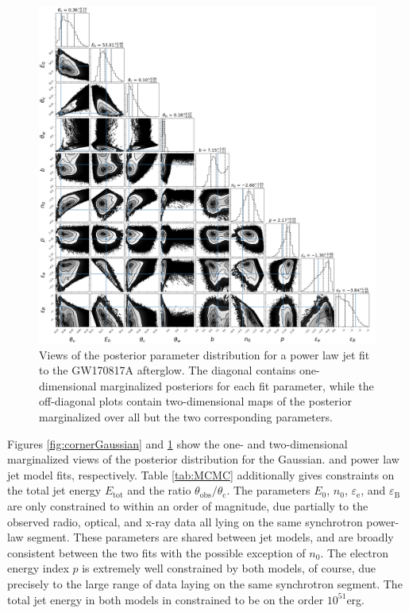 \documentclass[twocolumn]{aastex62}
\newcommand{\gwbns}{GW170817A}
\newcommand{\thobs}{\ensuremath{\theta_{\mathrm{obs}}}}
\newcommand{\thC}{\ensuremath{\theta_{\mathrm{c}}}}
\newcommand{\epse}{\ensuremath{\varepsilon_{\mathrm{e}}}}
\newcommand{\epsB}{\ensuremath{\varepsilon_{\mathrm{B}}}}
\newcommand{\Etot}{\ensuremath{E_{\mathrm{tot}}}}
\begin{document}
\begin{figure}
	\includegraphics[width=\textwidth]{figs/cornerPowerlaw.png}
	\caption{Views of the posterior parameter distribution for a power law jet fit to the \gwbns{} afterglow.  The diagonal contains one-dimensional marginalized posteriors for each fit parameter, while the off-diagonal plots contain two-dimensional maps of the posterior marginalized over all but the two corresponding parameters. \label{fig:cornerPowerlaw}}
\end{figure}

Figures \ref{fig:cornerGaussian} and \ref{fig:cornerPowerlaw} show the one- and two-dimensional marginalized views of the posterior distribution for the Gaussian. and power law jet model fits, respectively.  Table \ref{tab:MCMC} additionally gives constraints on the total jet energy \Etot{} and the ratio $\thobs/\thC$. The parameters $E_0$, $n_0$, $\epse$, and $\epsB$ are only constrained to within an order of magnitude, due partially to the observed radio, optical, and x-ray data all lying on the same synchrotron power-law segment.  These parameters are shared between jet models, and are broadly consistent between the two fits with the possible exception of $n_0$.  The electron energy index $p$ is extremely well constrained by both models, of course, due precisely to the large range of data laying on the same synchrotron segment.  The total jet energy in both models in constrained to be on the order $10^{51}$erg.
\end{document}
